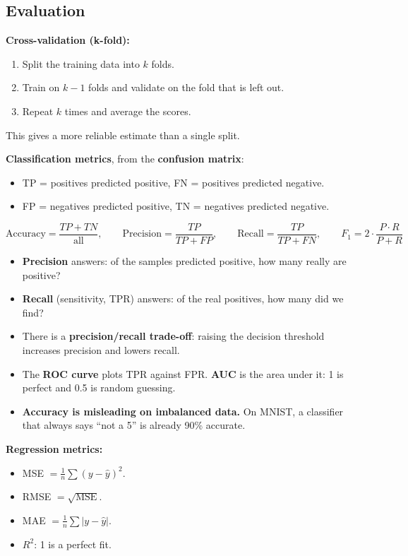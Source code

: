 \subsection{Evaluation}
\textbf{Cross-validation (k-fold):}
\begin{enumerate}
  \item Split the training data into $k$ folds.
  \item Train on $k-1$ folds and validate on the fold that is left out.
  \item Repeat $k$ times and average the scores.
\end{enumerate}
This gives a more reliable estimate than a single split.

\textbf{Classification metrics}, from the \textbf{confusion matrix}:
\begin{itemize}
  \item TP = positives predicted positive, FN = positives predicted negative.
  \item FP = negatives predicted positive, TN = negatives predicted negative.
\end{itemize}
\[
\text{Accuracy}=\frac{TP+TN}{\text{all}},\qquad
\text{Precision}=\frac{TP}{TP+FP},\qquad
\text{Recall}=\frac{TP}{TP+FN},\qquad
F_1=2\cdot\frac{P\cdot R}{P+R}
\]
\begin{itemize}
  \item \textbf{Precision} answers: of the samples predicted positive, how many really are positive?
  \item \textbf{Recall} (sensitivity, TPR) answers: of the real positives, how many did we find?
  \item There is a \textbf{precision/recall trade-off}: raising the decision threshold increases precision and lowers recall.
  \item The \textbf{ROC curve} plots TPR against FPR. \textbf{AUC} is the area under it: 1 is perfect and 0.5 is random guessing.
  \item \textbf{Accuracy is misleading on imbalanced data.} On MNIST, a classifier that always says ``not a 5'' is already 90\% accurate.
\end{itemize}
\textbf{Regression metrics:}
\begin{itemize}
  \item MSE $=\frac1n\sum(y-\hat y)^2$.
  \item RMSE $=\sqrt{\text{MSE}}$.
  \item MAE $=\frac1n\sum|y-\hat y|$.
  \item $R^2$: 1 is a perfect fit.
\end{itemize}

